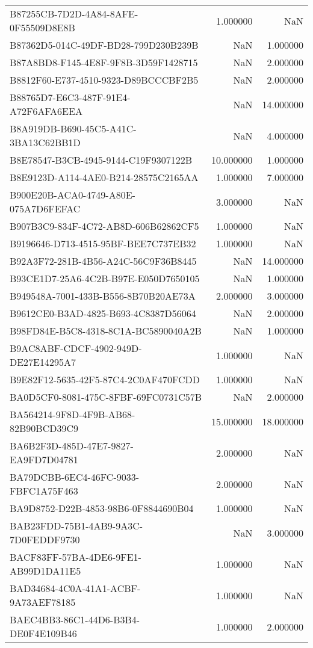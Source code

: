 \begin{tabular}{lrr}
B87255CB-7D2D-4A84-8AFE-0F55509D8E8B & 1.000000 & NaN \\
B87362D5-014C-49DF-BD28-799D230B239B & NaN & 1.000000 \\
B87A8BD8-F145-4E8F-9F8B-3D59F1428715 & NaN & 2.000000 \\
B8812F60-E737-4510-9323-D89BCCCBF2B5 & NaN & 2.000000 \\
B88765D7-E6C3-487F-91E4-A72F6AFA6EEA & NaN & 14.000000 \\
B8A919DB-B690-45C5-A41C-3BA13C62BB1D & NaN & 4.000000 \\
B8E78547-B3CB-4945-9144-C19F9307122B & 10.000000 & 1.000000 \\
B8E9123D-A114-4AE0-B214-28575C2165AA & 1.000000 & 7.000000 \\
B900E20B-ACA0-4749-A80E-075A7D6FEFAC & 3.000000 & NaN \\
B907B3C9-834F-4C72-AB8D-606B62862CF5 & 1.000000 & NaN \\
B9196646-D713-4515-95BF-BEE7C737EB32 & 1.000000 & NaN \\
B92A3F72-281B-4B56-A24C-56C9F36B8445 & NaN & 14.000000 \\
B93CE1D7-25A6-4C2B-B97E-E050D7650105 & NaN & 1.000000 \\
B949548A-7001-433B-B556-8B70B20AE73A & 2.000000 & 3.000000 \\
B9612CE0-B3AD-4825-B693-4C8387D56064 & NaN & 2.000000 \\
B98FD84E-B5C8-4318-8C1A-BC5890040A2B & NaN & 1.000000 \\
B9AC8ABF-CDCF-4902-949D-DE27E14295A7 & 1.000000 & NaN \\
B9E82F12-5635-42F5-87C4-2C0AF470FCDD & 1.000000 & NaN \\
BA0D5CF0-8081-475C-8FBF-69FC0731C57B & NaN & 2.000000 \\
BA564214-9F8D-4F9B-AB68-82B90BCD39C9 & 15.000000 & 18.000000 \\
BA6B2F3D-485D-47E7-9827-EA9FD7D04781 & 2.000000 & NaN \\
BA79DCBB-6EC4-46FC-9033-FBFC1A75F463 & 2.000000 & NaN \\
BA9D8752-D22B-4853-98B6-0F8844690B04 & 1.000000 & NaN \\
BAB23FDD-75B1-4AB9-9A3C-7D0FEDDF9730 & NaN & 3.000000 \\
BACF83FF-57BA-4DE6-9FE1-AB99D1DA11E5 & 1.000000 & NaN \\
BAD34684-4C0A-41A1-ACBF-9A73AEF78185 & 1.000000 & NaN \\
BAEC4BB3-86C1-44D6-B3B4-DE0F4E109B46 & 1.000000 & 2.000000 \\

\end{tabular}
